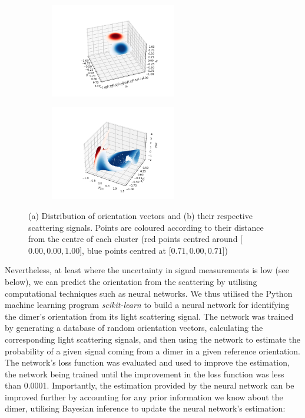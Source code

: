 \documentclass[12pt]{spieman}
\begin{document}
\begin{spacing}{1.5}
\begin{figure}[h]
	\centering
	\begin{subfigure}{0.4\textwidth}
		\subcaption{}
		\includegraphics[width=5.5cm]{./Images/fig3a.png}
	\end{subfigure}
	\begin{subfigure}{0.4\textwidth}
		\subcaption{}
		\includegraphics[width=5.5cm]{./Images/fig3b.png}
	\end{subfigure}
	\caption{(a) Distribution of orientation vectors and (b) their respective scattering signals. Points are coloured according to their distance from the centre of each cluster (red points centred around [$0.00, 0.00, 1.00$], blue points centred at [$0.71, 0.00, 0.71$])}
	\label{fig:mixing}
\end{figure}

Nevertheless, at least where the uncertainty in signal measurements is low (see below), we can predict the orientation from the scattering by utilising computational techniques such as neural networks. We thus utilised the Python machine learning program \textit{scikit-learn} to build a neural network for identifying the dimer's orientation from its light scattering signal. The network was trained by generating a database of random orientation vectors, calculating the corresponding light scattering signals, and then using the network to estimate the probability of a given signal coming from a dimer in a given reference orientation. The network's loss function was evaluated and used to improve the estimation, the network being trained until the improvement in the loss function was less than 0.0001. 
%
Importantly, the estimation provided by the neural network can be improved further by accounting for any prior information we know about the dimer, utilising Bayesian inference to update the neural network's estimation: 


\end{spacing}
\end{document}
